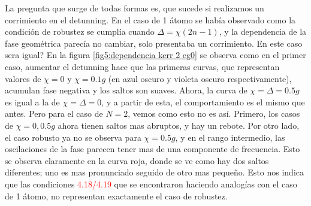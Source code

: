 La pregunta que surge de todas formas es, que sucede si realizamos un corrimiento en el detunning. En el caso de 1 átomo se había observado como la condición de robustez se cumplía cuando $\Delta=\chi(2n-1)$, y la dependencia de la fase geométrica parecía no cambiar, solo presentaba un corrimiento. En este caso sera igual?
En la figura \ref{fig5:dependencia kerr 2 eg0} se observa como en el primer caso, aumentar el detunning hace que las primeras curvas, que representan valores de $\chi=0$ y $\chi=0.1g$ (en azul oscuro y violeta oscuro respectivamente), acumulan fase negativa y los saltos son suaves. Ahora, la curva de $\chi=\Delta=0.5g$ es igual a la de $\chi=\Delta=0$, y a partir de esta, el comportamiento es el mismo que antes. Pero para el caso de $N=2$, vemos como esto no es así. Primero, los casos de $\chi=0,0.5g$ ahora tienen saltos mas abruptos, y hay un rebote. Por otro lado, el caso robusto ya no se observa para $\chi=0.5g$, y en el rango intermedio, las oscilaciones de la fase parecen tener mas de una componente de frecuencia. Esto se observa claramente en la curva roja, donde se ve como hay dos saltos diferentes; uno es mas pronunciado seguido de otro mas pequeño. Esto nos indica que las condiciones \textcolor{red}{4.18/4.19} que se encontraron haciendo analogías con el caso de 1 átomo, no representan exactamente el caso de robustez.


